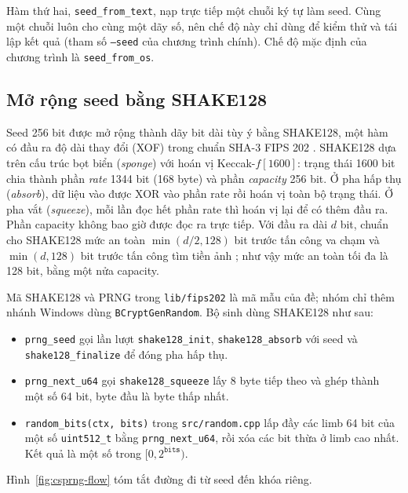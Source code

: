Hàm thứ hai, \texttt{seed\_from\_text}, nạp trực tiếp một chuỗi ký tự làm seed. Cùng một chuỗi luôn cho cùng một dãy số, nên chế độ này chỉ dùng để kiểm thử và tái lập kết quả (tham số \texttt{--seed} của chương trình chính). Chế độ mặc định của chương trình là \texttt{seed\_from\_os}.

\subsection{Mở rộng seed bằng SHAKE128}

Seed 256 bit được mở rộng thành dãy bit dài tùy ý bằng SHAKE128, một hàm có đầu ra độ dài thay đổi (XOF) trong chuẩn SHA-3 FIPS 202 \cite{fips202}. SHAKE128 dựa trên cấu trúc bọt biển (\emph{sponge}) với hoán vị Keccak-$f[1600]$: trạng thái 1600 bit chia thành phần \emph{rate} 1344 bit (168 byte) và phần \emph{capacity} 256 bit. Ở pha hấp thụ (\emph{absorb}), dữ liệu vào được XOR vào phần rate rồi hoán vị toàn bộ trạng thái. Ở pha vắt (\emph{squeeze}), mỗi lần đọc hết phần rate thì hoán vị lại để có thêm đầu ra. Phần capacity không bao giờ được đọc ra trực tiếp. Với đầu ra dài $d$ bit, chuẩn cho SHAKE128 mức an toàn $\min(d/2, 128)$ bit trước tấn công va chạm và $\min(d, 128)$ bit trước tấn công tìm tiền ảnh \cite{fips202}; như vậy mức an toàn tối đa là 128 bit, bằng một nửa capacity.

Mã SHAKE128 và PRNG trong \texttt{lib/fips202} là mã mẫu của đề; nhóm chỉ thêm nhánh Windows dùng \texttt{BCryptGenRandom}. Bộ sinh dùng SHAKE128 như sau:
\begin{itemize}
  \item \texttt{prng\_\allowbreak{}seed} gọi lần lượt \texttt{shake128\_\allowbreak{}init}, \texttt{shake128\_\allowbreak{}absorb} với seed và \texttt{shake128\_\allowbreak{}finalize} để đóng pha hấp thụ.
  \item \texttt{prng\_\allowbreak{}next\_\allowbreak{}u64} gọi \texttt{shake128\_\allowbreak{}squeeze} lấy 8 byte tiếp theo và ghép thành một số 64 bit, byte đầu là byte thấp nhất.
  \item \texttt{random\_\allowbreak{}bits(ctx, bits)} trong \texttt{src/random.cpp} lấp đầy các limb 64 bit của một số \texttt{uint512\_\allowbreak{}t} bằng \texttt{prng\_\allowbreak{}next\_\allowbreak{}u64}, rồi xóa các bit thừa ở limb cao nhất. Kết quả là một số trong $[0, 2^{\texttt{bits}})$.
\end{itemize}
Hình~\ref{fig:csprng-flow} tóm tắt đường đi từ seed đến khóa riêng.

